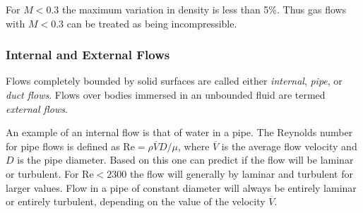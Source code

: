 For $M < \num{0,3} $ the maximum variation in density is less than 5\%. Thus gas flows with $M<\num{0,3} $ can be treated as being incompressible.


\subsubsection{Internal and External Flows}
Flows completely bounded by solid surfaces are called either \textit{internal}, \textit{pipe}, or \textit{duct flows}. Flows over bodies immersed in an unbounded fluid are termed \textit{external flows}.

An example of an internal flow is that of water in a pipe. The Reynolds number for pipe flows is defined as $\mathrm{Re} = \rho \overline{V} D / \mu$, where $\overline{V}$ is the average flow velocity and $D$ is the pipe diameter. Based on this one can predict if the flow will be laminar or turbulent. For $\mathrm{Re} < \num{2300} $ the flow will generally by laminar and turbulent for larger values. Flow in a pipe of constant diameter will always be entirely laminar or entirely turbulent, depending on the value of the velocity $\overline{V}$.
